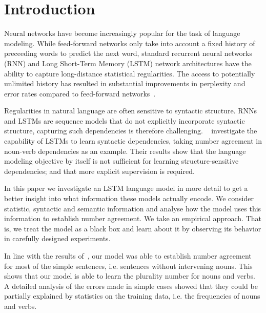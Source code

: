 \section{Introduction}

Neural networks have become increasingly popular
for the task of language modeling.
While feed-forward networks only take into account
a fixed history of preceeding words to predict the next word,
standard recurrent neural networks (RNN) and 
Long Short-Term Memory (LSTM) network architectures
have the ability to capture long-distance statistical regularities.
The access to potentially unlimited history 
has resulted in substantial improvements 
in perplexity and error rates
compared to feed-forward networks~\citep{Mikolov2010,Sundermeyer2013}. 

Regularities in natural language are often sensitive to syntactic structure.
RNNs and LSTMs are sequence models that do not explicitly
incorporate syntactic structure,
capturing such dependencies is therefore challenging.
~\cite{Linzen2016} investigate the capability
of LSTMs to learn syntactic dependencies, taking
number agreement in noun-verb dependencies as an example.
Their results show that the language modeling objective by itself
is not sufficient for learning structure-sensitive dependencies;
and that more explicit supervision is required.

In this paper we investigate an LSTM language model
in more detail to get a better insight into what 
information these models actually encode.
We consider statistic, syntactic and semantic information
and analyse how the model uses this information
to establish number agreement. 
We take an empirical approach.
That is, we treat the model as a black box
and learn about it by observing its behavior
in carefully designed experiments.

In line with the results of~\citep{Linzen2016},
our model was able to establish number agreement 
for most of the simple sentences,
i.e. sentences without intervening nouns.
This shows that our model is able to learn the 
plurality number for nouns and verbs.
A detailed analysis of the errors made in simple cases
showed that they could be partially explained by 
statistics on the training data,
i.e. the frequencies of nouns and verbs.
%

